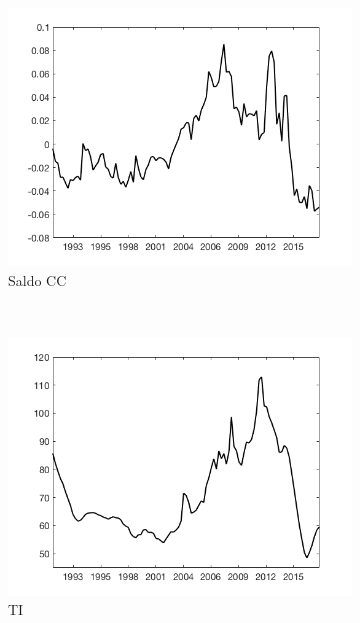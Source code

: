 \documentclass[12pt,letterpaper]{article}
\begin{document}
\begin{figure}
    \begin{subfigure}[b]{0.49\textwidth}
        \includegraphics[width=\textwidth]{fig9}
        \caption{Saldo CC}
    \end{subfigure}
    ~ %
   \begin{subfigure}[b]{0.49\textwidth}
       \includegraphics[width=\textwidth]{fig10}
        \caption{TI}
    \end{subfigure}
    \begin{subfigure}[b]{0.49\textwidth}

\end{subfigure}
\end{figure}
\end{document}
